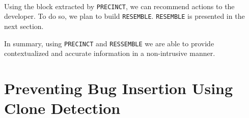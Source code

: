

\\
Using the block extracted by {\tt PRECINCT}, we can recommend actions to the developer.
To do so, we plan to build {\tt RESEMBLE}.
{\tt RESEMBLE} is presented in the next section.




In summary, using {\tt PRECINCT} and {\tt RESSEMBLE} we are able to provide contextualized and accurate information in a non-intrusive manner.

\chapter{Preventing Bug Insertion Using Clone Detection\label{chap:bianca}}



%
% 
